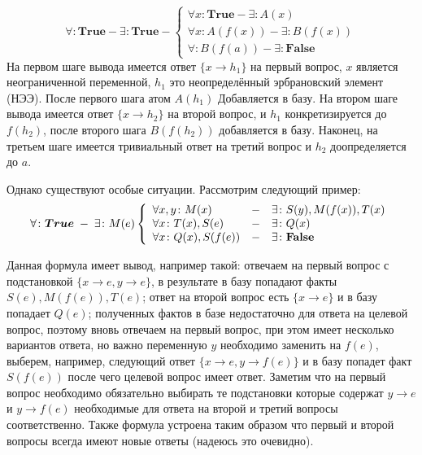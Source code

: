\begin{equation}
	\forall\colon\boldsymbol{True} - \exists\colon\boldsymbol{True} -
	\left\lbrace
	\begin{array}{l}
		\forall x\colon\boldsymbol{True} - \exists\colon A(x) \\
		\forall x\colon A(f(x)) - \exists\colon B(f(x)) \\
		\forall\colon B(f(a)) - \exists\colon \boldsymbol{False}
	\end{array}\right.
\end{equation}
На первом шаге вывода имеется ответ $\{x \rightarrow h_1\}$ на первый вопрос, $x$ является неограниченной переменной, $h_1$ это неопределённый эрбрановский элемент (НЭЭ). После первого шага атом $A(h_1)$ Добавляется в базу. На втором шаге вывода имеется ответ $\{x \rightarrow h_2\}$ на второй вопрос, и $h_1$ конкретизируется до $f(h_2)$, после второго шага $B(f(h_2))$ добавляется в базу. Наконец, на третьем шаге имеется тривиальный ответ на третий вопрос и $h_2$ доопределяется до $a$.

Однако существуют особые ситуации. Рассмотрим следующий пример:
$$\forall\colon\boldsymbol{True} \; - \; \exists\colon M(e) \left\{
\begin{array}{lcl}
 \forall x,y\colon M(x) & - & \exists\colon S(y),M(f(x)),T(x) \\
 \forall x \colon T(x),S(e) & - & \exists\colon Q(x) \\
 \forall x \colon Q(x),S(f(e)) & - & \exists\colon\textbf{False}
\end{array}
\right.$$

Данная формула имеет вывод, например такой: отвечаем на первый вопрос с подстановкой $\{ x\rightarrow e, y\rightarrow e \}$, в результате в базу попадают факты $S(e),M(f(e)),T(e)$; ответ на второй вопрос есть $\{ x \rightarrow e\}$ и в базу попадает $Q(e)$; полученных фактов в базе недостаточно для ответа на целевой вопрос, поэтому вновь отвечаем на первый вопрос, при этом имеет несколько вариантов ответа, но важно переменную $y$ необходимо заменить на $f(e)$, выберем, например, следующий ответ $\{x \rightarrow e, y \rightarrow f(e) \}$ и в базу попадет факт $S(f(e))$ после чего целевой вопрос имеет ответ.
Заметим что на первый вопрос необходимо обязательно выбирать те подстановки которые содержат $y \rightarrow e$ и $y \rightarrow f(e)$ необходимые для ответа на второй и третий вопросы соответственно. Также формула устроена таким образом что первый и второй вопросы всегда имеют новые ответы (надеюсь это очевидно).


